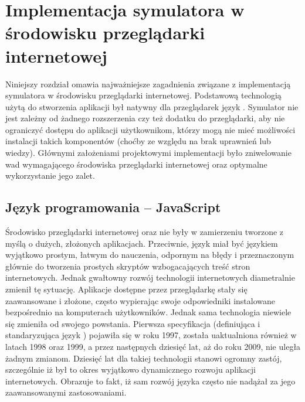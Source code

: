 \chapter{Implementacja symulatora w środowisku przeglądarki internetowej}
\label{cha:implementacja}

Niniejszy rozdział omawia najważniejsze zagadnienia związane z implementacją
symulatora \en w środowisku przeglądarki internetowej. Podstawową technologią
użytą do stworzenia aplikacji był natywny dla przeglądarek język \js.
Symulator nie jest zależny od żadnego rozszerzenia czy też dodatku do
przeglądarki, aby nie ograniczyć dostępu do aplikacji użytkownikom, którzy
mogą nie mieć możliwości instalacji takich komponentów (choćby ze względu na
brak uprawnień lub wiedzy). Głównymi założeniami projektowymi implementacji
było zniwelowanie wad wymagającego środowiska przeglądarki internetowej oraz
optymalne wykorzystanie jego zalet.

\section{Język programowania -- JavaScript}

Środowisko przeglądarki internetowej oraz \js nie były w zamierzeniu tworzone
z myślą o dużych, złożonych aplikacjach. Przeciwnie, język \js miał być
językiem wyjątkowo prostym, łatwym do nauczenia, odpornym na błędy i
przeznaczonym głównie do tworzenia prostych skryptów wzbogacających treść
stron internetowych. Jednak gwałtowny rozwój technologii internetowych
diametralnie zmienił tę sytuację. Aplikacje dostępne przez przeglądarkę stały
się zaawansowane i złożone, często wypierając swoje odpowiedniki instalowane
bezpośrednio na komputerach użytkowników. Jednak sama technologia niewiele się
zmieniła od swojego powstania. Pierwsza specyfikacja 
(definiująca i standaryzująca język ) pojawiła się w roku 1997,
została uaktualniona również w latach 1998 oraz 1999, a przez następnych
dziesięć lat, aż do roku 2009, nie uległa żadnym zmianom. Dziesięć lat dla
takiej technologii stanowi ogromny zastój, szczególnie iż był to okres
wyjątkowo dynamicznego rozwoju aplikacji internetowych. Obrazuje to fakt, iż
sam rozwój języka często nie nadążał za jego zaawansowanymi zastosowaniami.

